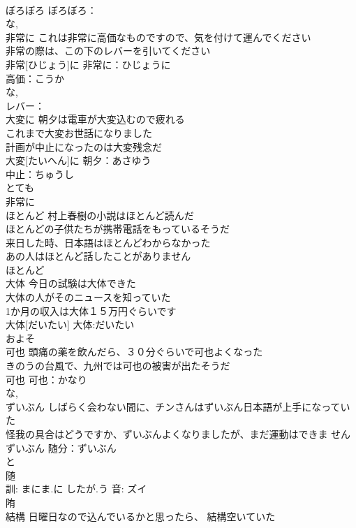 \documentclass[8pt]{extreport}
\begin{document}
\begin{CJK}{UTF8}{min}
\\	ぼろぼろ			ぼろぼろ：
\\	な, 
\\	非常に	これは非常に高価なものですので、気を付けて運んでください 
\\	非常の際は、この下のレバーを引いてください 
\\	非常[ひじょう]に			非常に：ひじょうに
\\	高価：こうか
\\	な, 
\\	レバー：
\\	大変に	朝夕は電車が大変込むので疲れる 
\\	これまで大変お世話になりました 
\\	計画が中止になったのは大変残念だ 
\\	大変[たいへん]に			朝夕：あさゆう
\\	中止：ちゅうし
\\	とても 
\\	非常に 
\\	ほとんど	村上春樹の小説はほとんど読んだ 
\\	ほとんどの子供たちが携帯電話をもっているそうだ 
\\	来日した時、日本語はほとんどわからなかった 
\\	あの人はほとんど話したことがありません 
\\	ほとんど						
\\	大体	今日の試験は大体できた 
\\	大体の人がそのニュースを知っていた 
\\	1か月の収入は大体１５万円ぐらいです 
\\	大体[だいたい]			大体:だいたい
\\	およそ 
\\	可也	頭痛の薬を飲んだら、３０分ぐらいで可也よくなった 
\\	きのうの台風で、九州では可也の被害が出たそうだ 
\\	可也			可也：かなり
\\	な, 
\\	ずいぶん	しばらく会わない間に、チンさんはずいぶん日本語が上手になっていた 
\\	怪我の具合はどうですか、ずいぶんよくなりましたが、まだ運動はできま せん 
\\	ずいぶん			随分：ずいぶん
\\	と 
\\	随 
\\	訓: まにま.に したが.う 音: ズイ 
\\	陏	
\\	結構	日曜日なので込んでいるかと思ったら、 結構空いていた 

\end{CJK}
\end{document}
